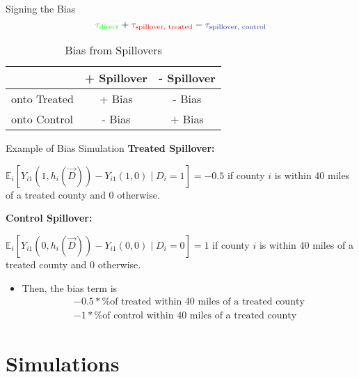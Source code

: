 \documentclass[aspectratio=169]{beamer}
\begin{document}
\begin{frame}{Signing the Bias}
    \[ 
        \textcolor{green}{\tau_{\text{direct}}} + \textcolor{red}{\tau_{\text{spillover, treated}}} - \textcolor{purple}{\tau_{\text{spillover, control}}}    
    \]

    \begin{table}
        \caption{Bias from Spillovers}
        \begin{tabular}{|l|cc|}
            \hline
            & + Spillover & - Spillover \\ \hline
            onto Treated & + Bias & - Bias \\
            onto Control & - Bias & + Bias \\
            \hline
        \end{tabular}
    \end{table}
\end{frame}

\begin{frame}{Example of Bias Simulation}
    \textbf{Treated Spillover:}
    
    $\mathbb{E}_i \left[ Y_{i1}(1, h_i(\vec{D})) - Y_{i1}(1, 0) \mid D_i = 1 \right] = -0.5$ if county $i$ is within 40 miles of a treated county and $0$ otherwise.
        
    \textbf{Control Spillover:}
    
    $\mathbb{E}_i \left[ Y_{i1}(0, h_i(\vec{D})) - Y_{i1}(0, 0) \mid D_i = 0 \right] = 1$ if county $i$ is within 40 miles of a treated county and $0$ otherwise.
        
    \begin{itemize}
        \item Then, the bias term is \begin{align*}
            -0.5 * \text{\% of treated within 40 miles of a treated county} \\
            -1 * \text{\% of control within 40 miles of a treated county}
        \end{align*}
    \end{itemize}
\end{frame}



\section{Simulations}
\end{document}

